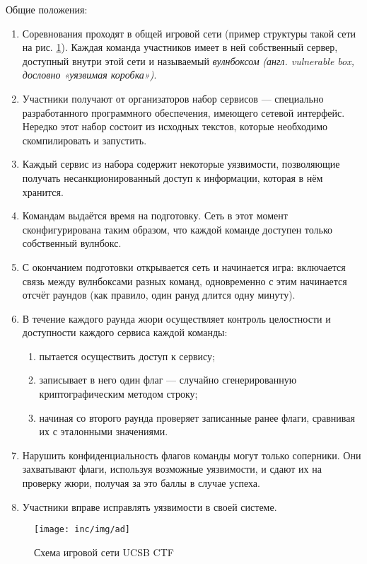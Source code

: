 Общие положения:
\begin{enumerate}
  \item Соревнования проходят в общей игровой сети (пример структуры такой сети на рис. \ref{fig:ad}). Каждая команда участников имеет в ней собственный сервер, доступный внутри этой сети и называемый \textit{вулнбоксом} \textit{(англ. vulnerable box, дословно «уязвимая коробка»)}.
  \item Участники получают от организаторов набор сервисов — специально разработанного программного обеспечения, имеющего сетевой интерфейс. Нередко этот набор состоит из исходных текстов, которые необходимо скомпилировать и запустить.
  \item Каждый сервис из набора содержит некоторые уязвимости, позволяющие получать несанкционированный доступ к информации, которая в нём хранится.
  \item Командам выдаётся время на подготовку. Сеть в этот момент сконфигурирована таким образом, что каждой команде доступен только собственный вулнбокс.
  \item С окончанием подготовки открывается сеть и начинается игра: включается связь между вулнбоксами разных команд, одновременно с этим начинается отсчёт раундов (как правило, один рануд длится одну минуту).
  \item В течение каждого раунда жюри осуществляет контроль целостности и доступности каждого сервиса каждой команды:
    \begin{enumerate}
    \item пытается осуществить доступ к сервису;
    \item записывает в него один флаг — случайно сгенерированную криптографическим методом строку;
    \item начиная со второго раунда проверяет записанные ранее флаги, сравнивая их с эталонными значениями.
    \end{enumerate}
  \item Нарушить конфиденциальность флагов команды могут только соперники. Они захватывают флаги, используя возможные уязвимости, и сдают их на проверку жюри, получая за это баллы в случае успеха.
  \item Участники вправе исправлять уязвимости в своей системе.
\end{enumerate}

\begin{figure}
  \centering
  \texttt{[image: inc/img/ad]}
  \caption{Схема игровой сети UCSB CTF}
  \label{fig:ad}
\end{figure}

